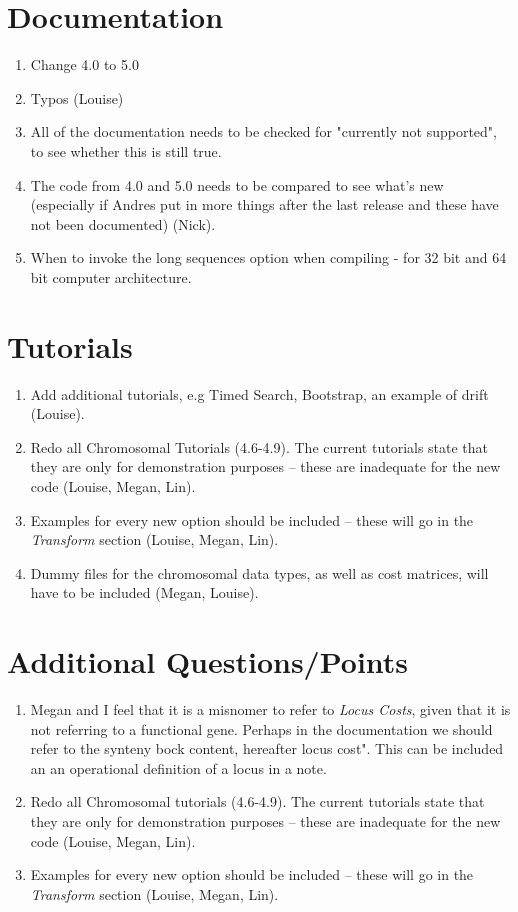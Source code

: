 \documentclass[11pt]{article}
\begin{document}
\section{Documentation}
\begin{enumerate}
\item{Change 4.0 to 5.0}
\item{Typos (Louise)}
\item{All of the documentation needs to be checked for "currently not supported", to see whether this is still true.}
\item{The code from 4.0 and 5.0 needs to be compared to see what's new (especially if Andres put in more things after the last release and these have not been documented) (Nick).}
\item{When to invoke the long sequences option when compiling - for 32 bit and 64 bit computer architecture.}
\end{enumerate}

\section{Tutorials}
\begin{enumerate}
\item{Add additional tutorials, e.g Timed Search, Bootstrap, an example of drift (Louise).}
\item{Redo all Chromosomal Tutorials (4.6-4.9).  The current tutorials state that they are only for demonstration purposes -- these are inadequate for the new code (Louise, Megan, Lin).}
\item{Examples for every new option should be included -- these will go in the \emph{Transform} section (Louise, Megan, Lin).}
\item{Dummy files for the chromosomal data types, as well as cost matrices, will have to be included (Megan, Louise).}
\end{enumerate}

\section{Additional Questions/Points}
\begin{enumerate}
\item{Megan and I feel that it is a misnomer to refer to \emph{Locus Costs}, given that it is not referring to a functional gene.  Perhaps in the documentation we should refer to the synteny bock content, hereafter locus cost".  This can be included an an operational definition of a locus in a note.}
\item{Redo all Chromosomal tutorials (4.6-4.9).  The current tutorials state that they are only for demonstration purposes -- these are inadequate for the new code (Louise, Megan, Lin).}
\item{Examples for every new option should be included -- these will go in the \emph{Transform} section (Louise, Megan, Lin).}
\end{enumerate}
\end{document}
